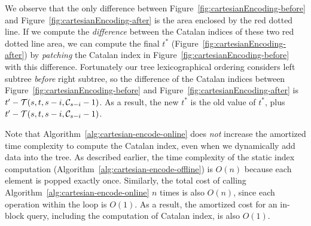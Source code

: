 We observe that the only difference between
Figure~\ref{fig:cartesianEncoding-before} and
Figure~\ref{fig:cartesianEncoding-after} is the area enclosed by the red
dotted line.  If we compute the {\em difference} between the Catalan
indices of these two red dotted line area, we can compute the final
$t^*$ (Figure~\ref{fig:cartesianEncoding-after}) by {\em patching} the
Catalan index in Figure~\ref{fig:cartesianEncoding-before} with this
difference. Fortunately our tree lexicographical ordering considers left
subtree {\em before} right subtree, so the difference of the Catalan
indices between Figure~\ref{fig:cartesianEncoding-before} and
Figure~\ref{fig:cartesianEncoding-after} is $t' - {\cal T}(s, t, s - i,
{\cal C}_{s-i} - 1)$.  As a result, the new $t^*$ is the old value of
$t^*$, plus $t' - {\cal T}(s, t, s - i, {\cal C}_{s-i} - 1)$.

Note that Algorithm~\ref{alg:cartesian-encode-online} does {\em not}
increase the amortized time complexity to compute the Catalan index,
even when we dynamically add data into the tree.  As described earlier,
the time complexity of the static index computation
(Algorithm~\ref{alg:cartesian-encode-offline}) is $O(n)$ because each
element is popped exactly once.  Similarly, the total cost of calling
Algorithm~\ref{alg:cartesian-encode-online} $n$ times is also $O(n)$,
since each operation within the loop is $O(1)$.  As a result, the
amortized cost for an in-block query, including the computation of
Catalan index, is also $O(1)$.
